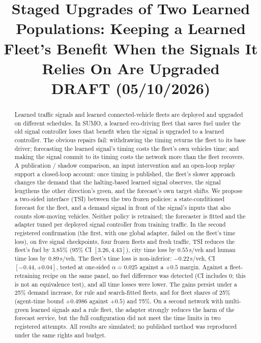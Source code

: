 \documentclass[11pt]{article}
\title{Staged Upgrades of Two Learned Populations: Keeping a Learned Fleet's Benefit When the Signals It Relies On Are Upgraded\\[4pt]
\large DRAFT (05/10/2026)}
\date{}
\begin{document}
\maketitle

\begin{abstract}
Learned traffic signals and learned connected-vehicle fleets are deployed and upgraded on different schedules. In SUMO, a learned
eco-driving fleet that saves fuel under the old signal controller loses that benefit when the signal is upgraded to a learned controller.
The obvious repairs fail: withdrawing the timing returns the fleet to its base driver; forecasting the learned signal's timing costs the
fleet's own vehicles time; and making the signal commit to its timing costs the network more than the fleet recovers. A publication /
shadow comparison, an input intervention and an open-loop replay support a closed-loop account: once timing is published, the fleet's
slower approach changes the demand that the halting-based learned signal observes, the signal lengthens the other direction's green, and
the forecast's own target shifts. We propose a two-sided interface (TSI) between the two frozen policies: a state-conditioned forecast for
the fleet, and a demand signal in front of the signal's inputs that also counts slow-moving vehicles. Neither policy is retrained; the
forecaster is fitted and the adapter tuned per deployed signal controller from training traffic. In the second registered confirmation
(the first, with one global adapter, failed on the fleet's time loss), on five signal checkpoints, four frozen fleets and fresh traffic,
TSI reduces the fleet's fuel by $3.85\%$ (95\% CI $[3.26, 4.43]$), city time loss by $0.55$\,s/veh and human time loss by $0.89$\,s/veh.
The fleet's time loss is non-inferior: $-0.22$\,s/veh, CI $[-0.44, +0.04]$, tested at one-sided $\alpha=0.025$ against a $+0.5$ margin.
Against a fleet-retraining recipe on the same panel, no fuel difference was detected (CI includes 0; this is not an equivalence test),
and all time losses were lower. The gains persist under a 25\% demand increase, for rule and search-fitted fleets, and for fleet shares
of 25\% (agent-time bound $+0.4986$ against $+0.5$) and 75\%. On a second network with multi-green learned signals and a rule fleet, the
adapter strongly reduces the harm of the forecast service, but the full configuration did not meet the time limits in two registered
attempts. All results are simulated; no published method was reproduced under the same rights and budget.
\end{abstract}
\end{document}
